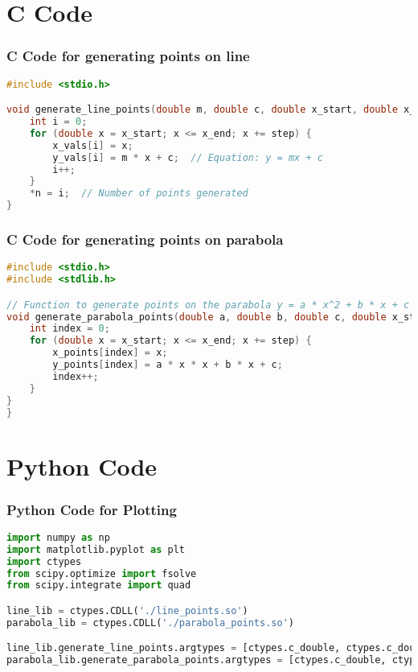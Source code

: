 \documentclass{beamer}
\theoremstyle{remark}
\numberwithin{equation}{section}
\begin{document}
\section{C Code}
\begin{frame}[fragile]
\frametitle{C Code for generating points on line}
\begin{lstlisting}[language=C]
#include <stdio.h>

void generate_line_points(double m, double c, double x_start, double x_end, double step, double *x_vals, double *y_vals, int *n) {
    int i = 0;
    for (double x = x_start; x <= x_end; x += step) {
        x_vals[i] = x;
        y_vals[i] = m * x + c;  // Equation: y = mx + c
        i++;
    }
    *n = i;  // Number of points generated
}
    \end{lstlisting}
\end{frame}
\begin{frame}[fragile]
\frametitle{C Code for generating points on parabola}
\begin{lstlisting}[language=C]
#include <stdio.h>
#include <stdlib.h>

// Function to generate points on the parabola y = a * x^2 + b * x + c
void generate_parabola_points(double a, double b, double c, double x_start, double x_end, double step, double* x_points, double* y_points) {
    int index = 0;
    for (double x = x_start; x <= x_end; x += step) {
        x_points[index] = x;
        y_points[index] = a * x * x + b * x + c;
        index++;
    }
}
}
\end{lstlisting}
\end{frame}


\section{Python Code}
\begin{frame}[fragile]
\frametitle{Python Code for Plotting}
\begin{lstlisting}[language=Python]
import numpy as np
import matplotlib.pyplot as plt
import ctypes
from scipy.optimize import fsolve
from scipy.integrate import quad

line_lib = ctypes.CDLL('./line_points.so')
parabola_lib = ctypes.CDLL('./parabola_points.so')

line_lib.generate_line_points.argtypes = [ctypes.c_double, ctypes.c_double, ctypes.c_double, ctypes.c_double, ctypes.c_double, ctypes.POINTER(ctypes.c_double), ctypes.POINTER(ctypes.c_double)]
parabola_lib.generate_parabola_points.argtypes = [ctypes.c_double, ctypes.c_double, ctypes.c_double, ctypes.c_double, ctypes.c_double, ctypes.c_double, ctypes.POINTER(ctypes.c_double), ctypes.POINTER(ctypes.c_double)]

\end{lstlisting}
\end{frame}
\end{document}
